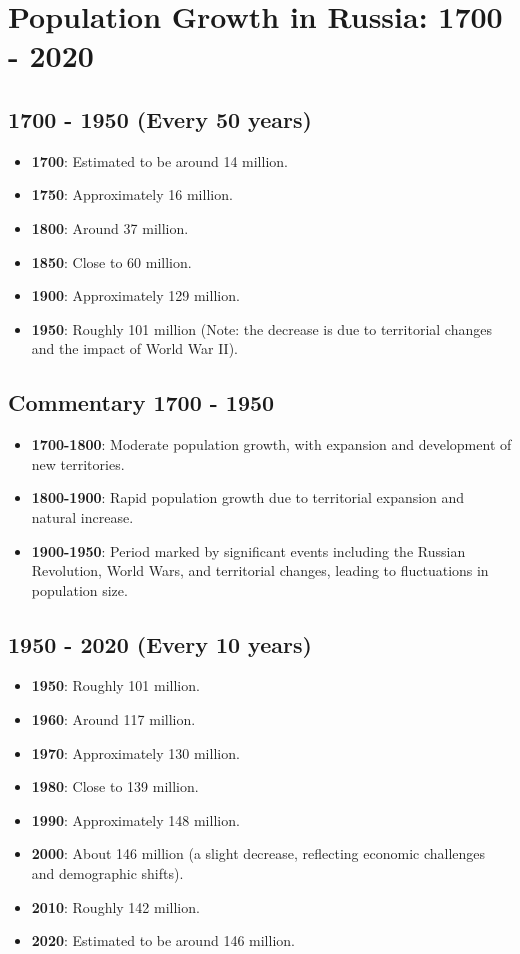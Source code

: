 \section*{Population Growth in Russia: 1700 - 2020}

\subsection*{1700 - 1950 (Every 50 years)}
\begin{itemize}
    \item \textbf{1700}: Estimated to be around 14 million.
    \item \textbf{1750}: Approximately 16 million.
    \item \textbf{1800}: Around 37 million.
    \item \textbf{1850}: Close to 60 million.
    \item \textbf{1900}: Approximately 129 million.
    \item \textbf{1950}: Roughly 101 million (Note: the decrease is due to territorial changes and the impact of World War II).
\end{itemize}

\subsection*{Commentary 1700 - 1950}
\begin{itemize}
    \item \textbf{1700-1800}: Moderate population growth, with expansion and development of new territories.
    \item \textbf{1800-1900}: Rapid population growth due to territorial expansion and natural increase.
    \item \textbf{1900-1950}: Period marked by significant events including the Russian Revolution, World Wars, and territorial changes, leading to fluctuations in population size.
\end{itemize}

\subsection*{1950 - 2020 (Every 10 years)}
\begin{itemize}
    \item \textbf{1950}: Roughly 101 million.
    \item \textbf{1960}: Around 117 million.
    \item \textbf{1970}: Approximately 130 million.
    \item \textbf{1980}: Close to 139 million.
    \item \textbf{1990}: Approximately 148 million.
    \item \textbf{2000}: About 146 million (a slight decrease, reflecting economic challenges and demographic shifts).
    \item \textbf{2010}: Roughly 142 million.
    \item \textbf{2020}: Estimated to be around 146 million.
\end{itemize}

